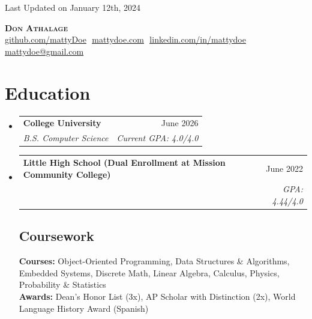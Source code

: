 \documentclass[letterpaper,11pt]{article}
\makeatletter
\newcommand{\resumeSubheading}[4]{
  \vspace{-2pt}\item
    \begin{tabular*}{0.97\textwidth}[t]{l@{\extracolsep{\fill}}r}
      \textbf{#1} & #2 \\
      \textit{\small#3} & \textit{\small #4} \\
    \end{tabular*}\vspace{-7pt}
}
\newcommand{\resumeSubHeadingListStart}{\begin{itemize}[leftmargin=0.15in, label={}]}
\newcommand{\resumeSubHeadingListEnd}{\end{itemize}}
\makeatother
\begin{document}
\begin{flushright}
  \color{gray}
  \item
  Last Updated on January 12th, 2024
\end{flushright}

\vspace{-5pt}

\begin{center}
    \textbf{\Huge \scshape Don Athalage} \\ \vspace{8pt}
    \small 
    \href{https://github.com/mattyDoe}{\underline{github.com/mattyDoe}} $  $
    \href{https://www.mattydoe.com}
    {\underline{mattydoe.com}} $  $
    \href{https://linkedin.com/in/mattydoe}{\underline{linkedin.com/in/mattydoe}} $  $
    \href{mailto:mattydoe@gmail.com}
    {\underline{mattydoe@gmail.com}}
\end{center}

\section{Education}
  \resumeSubHeadingListStart
  
    \resumeSubheading
      {College University}{June 2026}
      {B.S. Computer Science}{Current GPA: 4.0/4.0}
      
    \resumeSubheading
      {Little High School \footnotesize{(Dual Enrollment at Mission Community College)}}{June 2022}
      {}{GPA: 4.44/4.0}

    \vspace{-10pt}

    \subsection{Coursework}
      \textbf{Courses:} Object-Oriented Programming, Data Structures \& Algorithms, Embedded Systems, Discrete Math, Linear Algebra, Calculus, Physics, Probability \& Statistics \\
      \textbf{Awards:} Dean's Honor List (3x), AP Scholar with Distinction (2x), World Language History Award (Spanish)

  \resumeSubHeadingListEnd

\end{document}
